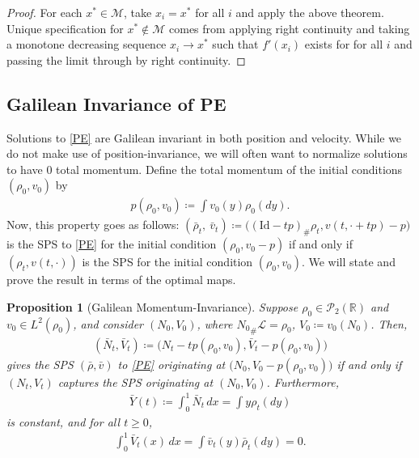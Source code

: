 \documentclass[11pt]{article}
\newtheorem{prop}[thm]{Proposition}
\numberwithin{equation}{section}
\begin{document}
    \begin{proof}
        For each $x^*\in \mathcal{M}$, take $x_i=x^*$ for all $i$ and apply the above theorem. 
        Unique specification for $x^*\notin \mathcal{M}$ comes from applying right continuity and taking a monotone decreasing sequence $x_i\to x^*$ such that $f'(x_i)$ exists for for all $i$ and passing the limit through by right continuity. 
    \end{proof}

\subsection{Galilean Invariance of PE}
    Solutions to \eqref{PE} are Galilean invariant in both position and velocity. While we do not make use of position-invariance, we will often want to normalize solutions to have $0$ total momentum. Define the total momentum of the initial conditions $(\rho_0,v_0)$ by 
    \begin{align*}
        p(\rho_0,v_0)\coloneq\int v_0(y)\rho_0(dy). 
    \end{align*}
    Now, this property goes as follows: $(\bar{\rho}_t,\ \bar{v}_t)\coloneq\big((\text{Id}-tp)_\#\rho_t,v(t,\cdot+tp)-p\big)$ is the SPS to \eqref{PE} for the initial condition $(\rho_0,v_0-p)$ if and only if $(\rho_t,v(t,\cdot))$ is the SPS for the initial condition $(\rho_0,v_0)$. We will state and prove the result in terms of the optimal maps. 
    \begin{prop}[Galilean Momentum-Invariance]\label{Galilean-Invariance}
        Suppose $\rho_0\in\mathcal{P}_2(\mathbb{R})$ and $v_0\in L^2(\rho_0)$, and consider $(N_0,V_0)$, where ${N_0}_\#\mathcal{L}=\rho_0$, $V_0\coloneq v_0(N_0)$. Then, 
    \begin{align*}
        (\bar{N}_t,\bar{V}_t)\coloneq\big(N_t-tp(\rho_0,v_0),\bar{V}_t-p(\rho_0,v_0)\big)
    \end{align*}
    gives the SPS $(\bar{\rho},\bar{v})$ to \eqref{PE} originating at $\big(N_0,V_0-p(\rho_0,v_0)\big)$ if and only if $(N_t,V_t)$ captures the SPS originating at $(N_0,V_0)$. Furthermore, 
    \begin{align*}
        \bar{Y}(t)\coloneq\int_0^1 \bar{N}_t \, dx=\int y\rho_t(dy)
    \end{align*}
    is constant, and for all $t\geq0$,
    \begin{align}\label{0-totalMomentum}
        \int_0^1 \bar{V}_t(x) \, dx=\int \bar{v}_t(y) \bar{\rho}_t(dy)=0.
    \end{align}
    \end{prop}
\end{document}
